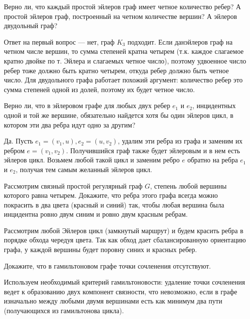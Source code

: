 \documentclass[a4paper,12pt,twoside]{article}
\begin{document}
\begin{?}
    Верно ли, что каждый простой эйлеров граф имеет четное количество ребер? А простой эйлеров граф, построенный на четном количестве вершин? А эйлеров двудольный граф?
\end{?}
\begin{solution}{}
    Ответ на первый вопрос --- нет, граф \(K_3\) подходит. Если  данэйлеров граф на четном числе вершин, то сумма степеней кратна четырем (т.к. каждое слагаемое кратно двойке по т. Эйлера и слагаемых четное число), поэтому удвоенное число ребер тоже должно быть кратно четырем, откуда ребер должно быть четное число. Для двудольного графа работает похожий аргумент: количество ребер это сумма степеней одной из долей, поэтому их будет четное число.
\end{solution}
\begin{?}
    Верно ли, что в эйлеровом графе для любых двух ребер $e_1$ и $e_2$, инцидентных одной и той же вершине, обязательно найдется хотя бы один эйлеров цикл, в котором эти два ребра идут одно за другим?
\end{?}
\begin{solution}{}
    Да. Пусть \(e_1 = (v_1, u), e_2 = (u, v_2)\), удалим эти ребра из графа и заменим их ребром \(e = (v_1, v_2)\). Получившийся граф также будет эйлеровым и в нем есть эйлеров цикл. Возьмем любой такой цикл и заменим ребро \(e\) обратно на ребра \(e_1\) и \(e_2\), получая тем самым желанный эйлеров цикл.
\end{solution}
\begin{?}
    Рассмотрим связный простой регулярный граф $G$, степень любой вершины которого равна четырем. Докажите, что ребра этого графа всегда можно покрасить в два цвета (красный и синий) так, чтобы любая вершина была инцидентна ровно двум синим и ровно двум красным ребрам.
\end{?}
\begin{solution}{}
    Рассмотрим любой Эйлеров цикл (замкнутый маршрут) и будем красить ребра в порядке обхода чередуя цвета. Так как обход дает сбалансированную ориентацию графа, у каждой вершины будет поровну синих и красных ребер. 
\end{solution}
\begin{?}
    Докажите, что в гамильтоновом графе точки сочленения отсутствуют.
\end{?}
\begin{solution}{}
    Используем необходимый критерий гамильтоновости: удаление точки сочленения ведет к образованию двух компонент связности, что невозможно, если в графе изначально между любыми двумя вершинами есть как минимум два пути (получающихся из гамильтонова цикла).
\end{solution}
\end{document}
